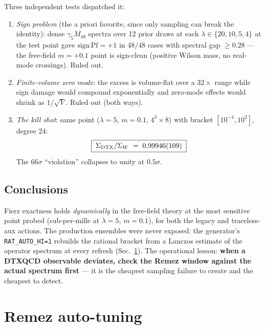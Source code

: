 \documentclass[11pt]{article}
\newcommand{\Sig}{\Sigma}
\begin{document}
Three independent tests dispatched it:
\begin{enumerate}
\item \emph{Sign problem} (the a priori favorite, since only sampling can
break the identity): dense $\gamma_{5}M_{48}$ spectra over 12 prior draws
at each $\lambda\in\{20,10,5,4\}$ at the test point gave
$\mathrm{sign}\,\mathrm{Pf}=+1$ in $48/48$ cases with spectral gap
$\ge0.28$ --- the free-field $m=+0.1$ point is sign-clean (positive Wilson
mass, no real-mode crossings).  Ruled out.
\item \emph{Finite-volume zero mode}: the excess is volume-flat over a
$32\times$ range while sign damage would compound exponentially and
zero-mode effects would shrink as $1/\sqrt V$.  Ruled out (both ways).
\item \emph{The kill shot}: same point ($\lambda=5$, $m=0.1$,
$4^{3}\times8$) with bracket $[10^{-4},10^{2}]$, degree 24:
\begin{equation}
\boxed{\;\Sig_{\rm DTX}/\Sig_{W} \;=\; 0.99946(109)\;}
\end{equation}
The $66\sigma$ ``violation'' collapses to unity at $0.5\sigma$.
\end{enumerate}

\subsection{Conclusions}

Fierz exactness holds \emph{dynamically} in the free-field theory at the
most sensitive point probed (sub-per-mille at $\lambda=5$, $m=0.1$), for
both the legacy and traceless-aux actions.  The production ensembles were
never exposed: the generator's \texttt{RAT\_AUTO\_HI=1} rebuilds the
rational bracket from a Lanczos estimate of the operator spectrum at every
refresh (Sec.~\ref{sec:remez}).  The operational lesson: \textbf{when a
DTXQCD observable deviates, check the Remez window against the actual
spectrum first} --- it is the cheapest sampling failure to create and the
cheapest to detect.

\section{Remez auto-tuning}
\label{sec:remez}
\end{document}
